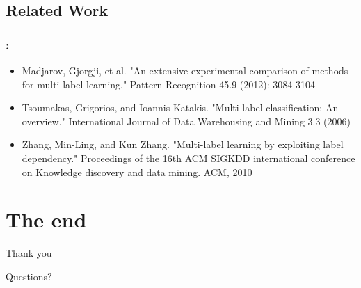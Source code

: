 \documentclass{beamer}
\begin{document}
\subsection{Related Work}
\begin{frame}
\frametitle{\insertsection : \insertsubsection}
\begin{itemize}
\item Madjarov, Gjorgji, et al. "An extensive experimental comparison of methods for multi-label learning." Pattern Recognition 45.9 (2012): 3084-3104
\item Tsoumakas, Grigorios, and Ioannis Katakis. "Multi-label classification: An overview." International Journal of Data Warehousing and Mining 3.3 (2006)
\item Zhang, Min-Ling, and Kun Zhang. "Multi-label learning by exploiting label dependency." Proceedings of the 16th ACM SIGKDD international conference on Knowledge discovery and data mining. ACM, 2010
\end{itemize}
\end{frame}

\section{The end}
\begin{frame}
\Huge{\centerline{Thank you}}
\Huge{\centerline{Questions?}}
\end{frame}
\end{document}
